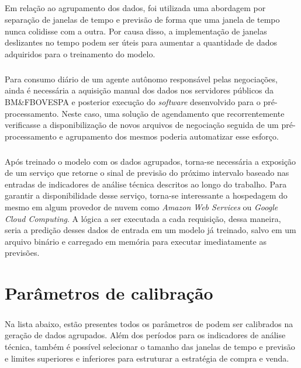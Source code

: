 \documentclass[grad,numbers]{coppe}
\begin{document}
        \paragraph{}Em relação ao agrupamento dos dados, foi utilizada uma abordagem por separação de janelas de tempo e previsão de forma que uma janela de tempo nunca colidisse com a outra. Por causa disso, a implementação de janelas deslizantes no tempo podem ser úteis para aumentar a quantidade de dados adquiridos para o treinamento do modelo.
        
        \paragraph{}Para consumo diário de um agente autônomo responsável pelas negociações, ainda é necessária a aquisição manual dos dados nos servidores públicos da BM\&FBOVESPA e posterior execução do \textit{software} desenvolvido para o pré-processamento. Neste caso, uma solução de agendamento que recorrentemente verificasse a disponibilização de novos arquivos de negociação seguida de um pré-processamento e agrupamento dos mesmos poderia automatizar esse esforço.
        
        \paragraph{}Após treinado o modelo com os dados agrupados, torna-se necessária a exposição de um serviço que retorne o sinal de previsão do próximo intervalo baseado nas entradas de indicadores de análise técnica descritos ao longo do trabalho. Para garantir a disponibilidade desse serviço, torna-se interessante a hospedagem do mesmo em algum provedor de nuvem como \textit{Amazon Web Services} ou \textit{Google Cloud Computing}. A lógica a ser executada a cada requisição, dessa maneira, seria a predição desses dados de entrada em um modelo já treinado, salvo em um arquivo binário e carregado em memória para executar imediatamente as previsões.
  

  \backmatter
  
  

  \appendix 
  \chapter{Parâmetros de calibração}\label{cap:params}
  
    \paragraph{}Na lista abaixo, estão presentes todos os parâmetros de podem ser calibrados na geração de dados agrupados. Além dos períodos para os indicadores de análise técnica, também é possível selecionar o tamanho das janelas de tempo e previsão e limites superiores e inferiores para estruturar a estratégia de compra e venda.
  
\end{document}
